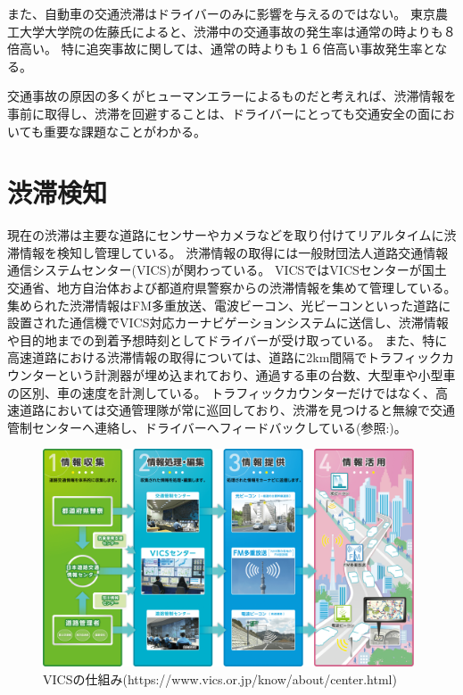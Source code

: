 また、自動車の交通渋滞はドライバーのみに影響を与えるのではない。
東京農工大学大学院の佐藤氏によると、渋滞中の交通事故の発生率は通常の時よりも８倍高い\cite{alma99344256104031}。
特に追突事故に関しては、通常の時よりも１６倍高い事故発生率となる。

交通事故の原因の多くがヒューマンエラーによるものだと考えれば、渋滞情報を事前に取得し、渋滞を回避することは、ドライバーにとっても交通安全の面においても重要な課題なことがわかる。

\newpage

\section{渋滞検知}
現在の渋滞は主要な道路にセンサーやカメラなどを取り付けてリアルタイムに渋滞情報を検知し管理している。
渋滞情報の取得には一般財団法人道路交通情報通信システムセンター(VICS)が関わっている。
VICSではVICSセンターが国土交通省、地方自治体および都道府県警察からの渋滞情報を集めて管理している。
集められた渋滞情報はFM多重放送、電波ビーコン、光ビーコンといった道路に設置された通信機でVICS対応カーナビゲーションシステムに送信し、渋滞情報や目的地までの到着予想時刻としてドライバーが受け取っている。
また、特に高速道路における渋滞情報の取得については、道路に2km間隔でトラフィックカウンターという計測器が埋め込まれており、通過する車の台数、大型車や小型車の区別、車の速度を計測している。
トラフィックカウンターだけではなく、高速道路においては交通管理隊が常に巡回しており、渋滞を見つけると無線で交通管制センターへ連絡し、ドライバーへフィードバックしている(参照:)。

\begin{figure}[htbp]
  \begin{center}
   \includegraphics[width=11cm]{figs/vics.png}
  \end{center}
  \caption{VICSの仕組み(https://www.vics.or.jp/know/about/center.html)}
  \label{fig:vics_system}
\end{figure}

